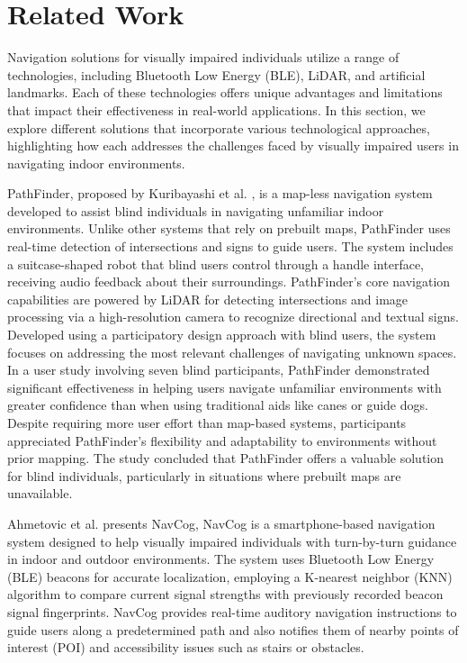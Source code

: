 \section{Related Work}

Navigation solutions for visually impaired individuals utilize a range of technologies, including Bluetooth Low Energy (BLE), LiDAR, and artificial landmarks. Each of these technologies offers unique advantages and limitations that impact their effectiveness in real-world applications. In this section, we explore different solutions that incorporate various technological approaches, highlighting how each addresses the challenges faced by visually impaired users in navigating indoor environments.

PathFinder, proposed by Kuribayashi et al. \cite{kuribayashi2023}, is a map-less navigation system developed to assist blind individuals in navigating unfamiliar indoor environments. Unlike other systems that rely on prebuilt maps, PathFinder uses real-time detection of intersections and signs to guide users. The system includes a suitcase-shaped robot that blind users control through a handle interface, receiving audio feedback about their surroundings. PathFinder’s core navigation capabilities are powered by LiDAR for detecting intersections and image processing via a high-resolution camera to recognize directional and textual signs. Developed using a participatory design approach with blind users, the system focuses on addressing the most relevant challenges of navigating unknown spaces. In a user study involving seven blind participants, PathFinder demonstrated significant effectiveness in helping users navigate unfamiliar environments with greater confidence than when using traditional aids like canes or guide dogs. Despite requiring more user effort than map-based systems, participants appreciated PathFinder’s flexibility and adaptability to environments without prior mapping. The study concluded that PathFinder offers a valuable solution for blind individuals, particularly in situations where prebuilt maps are unavailable.

Ahmetovic et al. \cite{ahmetovic2016} presents NavCog, NavCog is a smartphone-based navigation system designed to help visually impaired individuals with turn-by-turn guidance in indoor and outdoor environments. The system uses Bluetooth Low Energy (BLE) beacons for accurate localization, employing a K-nearest neighbor (KNN) algorithm to compare current signal strengths with previously recorded beacon signal fingerprints. NavCog provides real-time auditory navigation instructions to guide users along a predetermined path and also notifies them of nearby points of interest (POI) and accessibility issues such as stairs or obstacles.

